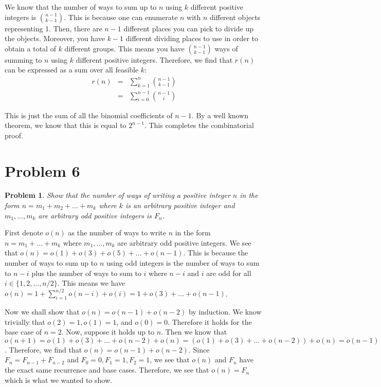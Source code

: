 \documentclass[psamsfonts]{amsart}
\newtheorem{prob}{Problem}[section]
\newenvironment{sol}{{\bfseries Solution}}{\qedsymbol}
\theoremstyle{definition}
\theoremstyle{remark}
\numberwithin{equation}{section}
\begin{document}
\begin{sol}
We know that the number of ways to sum up to $n$ using $k$ different positive integers is ${ n - 1 \choose k -1}$. This is because one can enumerate $n$ with $n$ different objects representing 1. Then, there are $n-1$ different places you can pick to divide up the objects. Moreover, you have $k - 1$ different dividing places to use in order to obtain a total of $k$ different groups. This means you have ${n - 1 \choose k - 1 }$ ways of summing to $n$ using $k$ different positive integers. Therefore, we find that $r(n)$ can be expressed as a sum over all feasible $k$:
\begin{eqnarray}
r(n) &=& \sum_{k=1}^{n} { n - 1 \choose k - 1} \\
&=& \sum_{i=0}^{n-1} { n - 1 \choose i}   
\end{eqnarray} 

This is just the sum of all the binomial coefficients of $n-1$. By a well known theorem, we know that this is equal to $2^{n-1}$. This completes the combinatorial proof. 
\end{sol}

\section{Problem 6}

\begin{prob}
Show that the number of ways of writing a positive integer $n$ in the form $n = m_1 + m_2 + \ldots + m_k$ where $k$ is an arbitrary positive integer and $m_1, \ldots, m_k$ are arbitrary odd positive integers is $F_n$. 
\end{prob}

\begin{sol}
First denote $o(n)$ as the number of ways to write $n$ in the form $n = m_1 + \ldots + m_k$ where $m_1, \ldots, m_k$ are arbitrary odd positive integers. We see that $o(n) = o(1) + o(3) + o(5) + \ldots + o(n-1)$. This is because the number of ways to sum up to $n$ using odd integers is the number of ways to sum to $n - i$ plus the number of ways to sum to $i$ where $n - i$ and $i$ are odd for all $i \in \{1, 2, \ldots, n/2\}$. This means we have $o(n) = 1 + \sum_{i=1}^{n/2} o(n-i) + o(i) = 1 + o(3) + \ldots + o(n-1)$. 

Now we shall show that $o(n) = o(n-1) + o(n-2)$ by induction. We know trivially that $o(2) = 1, o(1) = 1$, and $o(0) = 0$. Therefore it holds for the base case of $n = 2$. Now, suppose it holds up to $n$. Then we know that $o(n+1) = o(1) + o(3) + \ldots + o(n-2) + o(n) = (o(1) + o(3) + \ldots + o(n-2)) + o(n) = o(n-1) + o(n)$. Therefore, we find that $o(n) = o(n-1) + o(n-2)$. Since $F_n = F_{n-1} + F_{n-2}$ and $F_{0} = 0, F_{1} = 1, F_2 = 1$, we see that $o(n)$ and $F_n$ have the exact same recurrence and base cases. Therefore, we see that $o(n) = F_n$ which is what we wanted to show. 
\end{sol}
\end{document}
